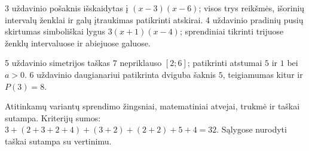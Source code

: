\documentclass[11pt]{article}
\begin{document}
3 uždavinio pošaknis išskaidytas į $(x-3)(x-6)$; visos trys reikšmės, išorinių intervalų ženklai ir galų įtraukimas patikrinti atskirai. 4 uždavinio pradinių pusių skirtumas simboliškai lygus $3(x+1)(x-4)$; sprendiniai tikrinti trijuose ženklų intervaluose ir abiejuose galuose.

5 uždavinio simetrijos taškas $7$ nepriklauso $[2;6]$; patikrinti atstumai $5$ ir $1$ bei $a>0$. 6 uždavinio daugianariui patikrinta dviguba šaknis $5$, teigiamumas kitur ir $P(3)=8$.

Atitinkamų variantų sprendimo žingsniai, matematiniai atvejai, trukmė ir taškai sutampa. Kriterijų sumos: $3+(2+3+2+4)+(3+2)+(2+2)+5+4=32$. Sąlygose nurodyti taškai sutampa su vertinimu.
\end{document}
